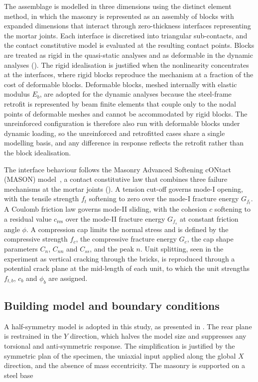 \documentclass[AMA,twocolumn]{USG} %
\begin{document}
The assemblage is modelled in three dimensions using the distinct element method, in which the masonry is represented as an assembly of blocks with expanded dimensions that interact through zero-thickness interfaces representing the mortar joints.
Each interface is discretised into triangular sub-contacts, and the contact constitutive model is evaluated at the resulting contact points.
Blocks are treated as rigid in the quasi-static analyses and as deformable in the dynamic analyses (). 
The rigid idealisation is justified when the nonlinearity concentrates at the interfaces, where rigid blocks reproduce the mechanism at a fraction of the cost of deformable blocks. 
Deformable blocks, meshed internally with elastic modulus $E_b$, are adopted for the dynamic analyses because the steel-frame retrofit is represented by beam finite elements that couple only to the nodal points of deformable meshes and cannot be accommodated by rigid blocks. 
The unreinforced configuration is therefore also run with deformable blocks under dynamic loading, so the unreinforced and retrofitted cases share a single modelling basis, and any difference in response reflects the retrofit rather than the block idealisation.

The interface behaviour follows the Masonry Advanced Softening cONtact (MASON) model~\cite{Oktiovan2026CyclicMethod}, a contact constitutive law that combines three failure mechanisms at the mortar joints ().
A tension cut-off governs mode-I opening, with the tensile strength $f_t$ softening to zero over the mode-I fracture energy $G_{f_t}$.
A Coulomb friction law governs mode-II sliding, with the cohesion $c$ softening to a residual value $c_{\mathrm{res}}$ over the mode-II fracture energy $G_{f_s}$ at constant friction angle $\phi$.
A compression cap limits the normal stress and is defined by the compressive strength $f_c$, the compressive fracture energy $G_c$, the cap shape parameters $C_n$, $C_{nn}$ and $C_{ss}$, and the peak $n$.
Unit splitting, seen in the experiment as vertical cracking through the bricks, is reproduced through a potential crack plane at the mid-length of each unit, to which the unit strengths $f_{t,b}$, $c_b$ and $\phi_b$ are assigned.

\subsection{Building model and boundary conditions}
A half-symmetry model is adopted in this study, as presented in .
The rear plane is restrained in the $Y$ direction, which halves the model size and suppresses any torsional and anti-symmetric response.
The simplification is justified by the symmetric plan of the specimen, the uniaxial input applied along the global $X$ direction, and the absence of mass eccentricity.
The masonry is supported on a steel base
\end{document}
